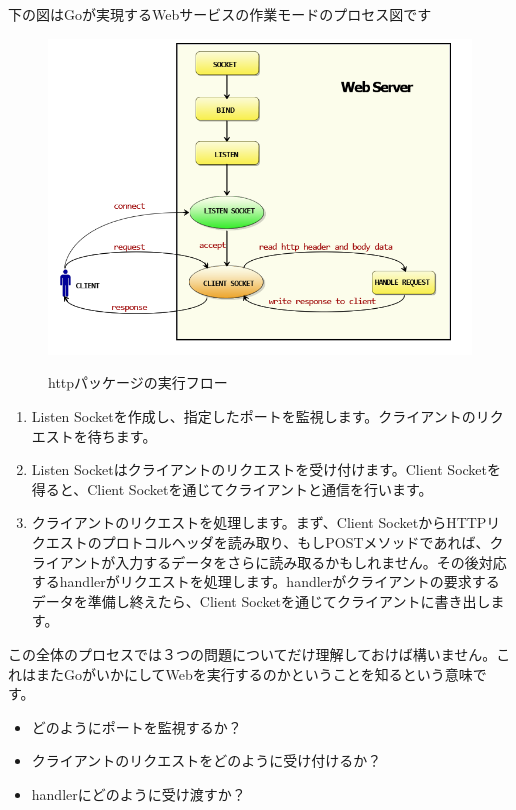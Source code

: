 下の図はGoが実現するWebサービスの作業モードのプロセス図です

\begin{figure}[H]
  \includegraphics[width=14cm]{3.3.http.png}
   \label{図3.9}
   \caption{httpパッケージの実行フロー}
\end{figure}

\begin{enumerate}
  \item Listen Socketを作成し、指定したポートを監視します。クライアントのリクエストを待ちます。
  \item Listen Socketはクライアントのリクエストを受け付けます。Client Socketを得ると、Client Socketを通じてクライアントと通信を行います。
  \item クライアントのリクエストを処理します。まず、Client SocketからHTTPリクエストのプロトコルヘッダを読み取り、もしPOSTメソッドであれば、クライアントが入力するデータをさらに読み取るかもしれません。その後対応するhandlerがリクエストを処理します。handlerがクライアントの要求するデータを準備し終えたら、Client Socketを通じてクライアントに書き出します。
\end{enumerate}

この全体のプロセスでは３つの問題についてだけ理解しておけば構いません。これはまたGoがいかにしてWebを実行するのかということを知るという意味です。

\begin{itemize}
  \item どのようにポートを監視するか？
  \item クライアントのリクエストをどのように受け付けるか？
  \item handlerにどのように受け渡すか？
\end{itemize}

